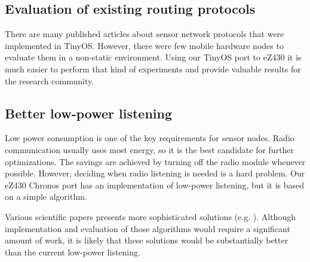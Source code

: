 \subsection{Evaluation of existing routing protocols}
There are many published articles about sensor network protocols that were implemented in TinyOS.
However, there were few mobile hardware nodes to evaluate them in a non-static environment.
Using our TinyOS port to eZ430 it is much easier to perform that kind of experiments and provide valuable results for the research community.

\subsection{Better low-power listening}
Low power consumption is one of the key requirements for sensor nodes.
Radio communication usually uses most energy, so it is the best candidate for further optimizations.
The savings are achieved by turning off the radio module whenever possible.
However, deciding when radio listening is needed is a hard problem.
Our eZ430 Chronos port has an implementation of low-power listening, but it is based on a simple algorithm.

Various scientific papers presents more sophisticated solutions (e.g. \cite{DCCLPL}).
Although implementation and evaluation of those algorithms would require a significant amount of work, it is likely that these solutions would be substantially better than the current low-power listening.


